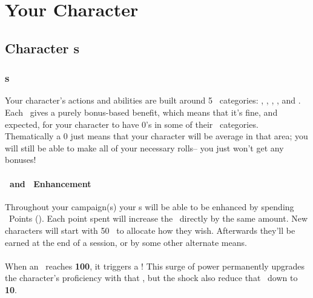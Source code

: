 \part{Your Character}\label{part:char_creation}
\chapter{Character \attribute s}\label{ch:char_attributes}

\section{\attribute s}\label{sec:attributes}
Your character's actions and abilities are built around 5 \attribute\ 
categories: \POWEful, \KNOWful, \ENDUful, \SPEDful, and \FOREful. Each \attribute\  gives a purely
bonus-based benefit, which means that it's fine, and expected, for
your character to have 0's in some of their \attribute\  categories.
Thematically a 0 just means that your character will be average in that
area; you will still be able to make all of your necessary rolls--
you just won't get any bonuses! 

\subsection{\attrval\ and \attribute\ Enhancement}\label{subsec:attr_points}
Throughout your campaign(s) your \attribute s will be able to be enhanced by spending \attribute\ Points (\attrval). Each point spent will increase the \attribute\ directly by the same amount. New characters will start with 50 \attrval\ to allocate how they wish. Afterwards they'll be earned at the end of a session, or by some other alternate means.


\subsection{\BURST\index{\BURST}}\label{subsec:BURST}
When an \attribute\ reaches \textbf{100}, it triggers a \BURST !
This surge of power permanently upgrades the character's proficiency with that \attribute , but the shock also reduce that \attribute\ down to \textbf{10}.

